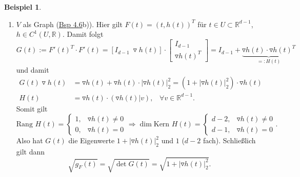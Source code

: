 \documentclass[a4paper]{scrreprt}
\newcommand{\R}{\mathbb{R}}
\newcommand{\jlabel}[1]{\label{j_#1}}
\newcommand{\jhyperref}[2]{\hyperref[j_#1]{#2}}
\newcommand{\jlink}[1]{\jhyperref{#1}{#1}}
\theoremstyle{plain}
\theoremstyle{definition}
\newtheorem{expl}[thm]{Beispiel}
\begin{document}
{{{{\begin{expl}
\begin{enumerate}
        \item
            \jlabel{Bsp 4.9b)}
            $V$ als Graph (\jlink{Bsp 4.6}b)). Hier gilt $F(t) = (t, h(t))^T$ für $t\in U \subset \R^{d-1}$, $h\in C^1(U,\R)$. Damit folgt
            \[
                G(t) := F'(t)^T\cdot F'(t) = \left[ I_{d-1} \ \triangledown h(t) \right] \cdot \begin{bmatrix}
                                                                                                    I_{d-1} \\
                                                                                                    \triangledown h(t)^T
                                                                                                \end{bmatrix} = I_{d-1} + \underbrace{\triangledown h(t) \cdot \triangledown h(t)^T}_{=: H(t)}
            \]
            und damit
            \[
                \begin{split}
                G(t)\triangledown h(t) &= \triangledown h(t) + \triangledown h(t)\cdot |\triangledown h(t)|_2^2 = (1 + |\triangledown h(t)|_2^2)\cdot \triangledown h(t)\\
                H(t) &= \triangledown h(t)\cdot (\triangledown h(t)|v), \hspace{10pt} \forall v\in\R^{d-1}.
                \end{split}
            \]
            Somit gilt
            \[
                \text{Rang } H(t) = \begin{cases}
                                       1, & \triangledown h(t) \ne 0 \\
                                       0, & \triangledown h(t) = 0
                                   \end{cases} \Rightarrow \dim \text{Kern } H(t) = \begin{cases}
                                                                                        d-2, & \triangledown h(t) \ne 0\\
                                                                                        d-1, & \triangledown h(t) = 0
                                                                                    \end{cases}.
            \]
            Also hat $G(t)$ die Eigenwerte $1 + |\triangledown h(t)|_2^2$ und $1$ ($d-2$ fach). Schließlich gilt dann
            \[
                \sqrt{g_F(t)} = \sqrt{\det G(t)} = \sqrt{1 + |\triangledown h(t)|_2^2}.
            \]


\end{enumerate}
\end{expl}}}}}
\end{document}
